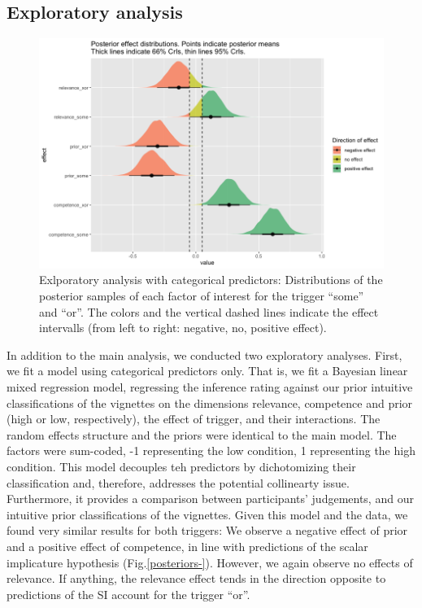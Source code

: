 \documentclass{sp}
\begin{document}
\subsection{Exploratory analysis}
\begin{figure}[t]
	\begin{center}
		\includegraphics[width=1\linewidth]{images/posterior-effects-categorical.png}
	\end{center}
	\vspace{-0.3cm}
	\caption{Exlporatory analysis with categorical predictors: Distributions of the posterior samples of each factor of interest for the trigger ``some'' and ``or''. The colors and the vertical dashed lines indicate the effect intervalls (from left to right: negative, no, positive effect).}
	\label{posteriors-cat}
\end{figure}
In addition to the main analysis, we conducted two exploratory analyses. First, we fit a model using categorical predictors only. That is, we fit a Bayesian linear mixed regression model, regressing the inference rating against our prior intuitive classifications of the vignettes on the dimensions relevance, competence and prior (high or low, respectively), the effect of trigger, and their interactions. The random effects structure and the priors were identical to the main model. The factors were sum-coded, -1 representing the low condition, 1 representing the high condition. 
This model decouples teh predictors by dichotomizing their classification and, therefore, addresses the potential collinearty issue. Furthermore, it provides a comparison between participants' judgements, and our intuitive prior classifications of the vignettes. 
Given this model and the data, we found very similar results for both triggers: We observe a negative effect of prior and a positive effect of competence, in line with predictions of the scalar implicature hypothesis (Fig.\ref{posteriors-}). However, we again observe no effects of relevance. If anything, the relevance effect tends in the direction opposite to predictions of the SI account for the trigger ``or''. 
\end{document}
